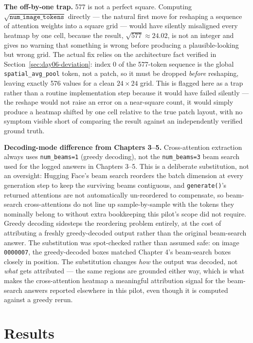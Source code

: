 \textbf{The off-by-one trap.} 577 is not a perfect square. Computing
$\sqrt{\texttt{num\_image\_tokens}}$ directly --- the natural first move for reshaping a sequence
of attention weights into a square grid --- would have silently misaligned every heatmap by one
cell, because the result, $\sqrt{577} \approx 24.02$, is not an integer and gives no warning that
something is wrong before producing a plausible-looking but wrong grid. The actual fix relies on
the architecture fact verified in Section~\ref{sec:day06-deviation}: index 0 of the 577-token
sequence is the global \texttt{spatial\_avg\_pool} token, not a patch, so it must be dropped
\emph{before} reshaping, leaving exactly 576 values for a clean $24 \times 24$ grid. This is
flagged here as a trap rather than a routine implementation step because it would have failed
silently --- the reshape would not raise an error on a near-square count, it would simply produce
a heatmap shifted by one cell relative to the true patch layout, with no symptom visible short of
comparing the result against an independently verified ground truth.

\textbf{Decoding-mode difference from Chapters 3--5.} Cross-attention extraction always uses
\texttt{num\_beams=1} (greedy decoding), not the \texttt{num\_beams=3} beam search used for the
logged answers in Chapters 3--5. This is a deliberate substitution, not an oversight: Hugging
Face's beam search reorders the batch dimension at every generation step to keep the surviving
beams contiguous, and \texttt{generate()}'s returned attentions are not automatically
un-reordered to compensate, so beam-search cross-attentions do not line up sample-by-sample with
the tokens they nominally belong to without extra bookkeeping this pilot's scope did not require.
Greedy decoding sidesteps the reordering problem entirely, at the cost of attributing a freshly
greedy-decoded output rather than the original beam-search answer. The substitution was
spot-checked rather than assumed safe: on image \texttt{0000007}, the greedy-decoded boxes
matched Chapter 4's beam-search boxes closely in position. The substitution changes \emph{how}
the output was decoded, not \emph{what} gets attributed --- the same regions are grounded either
way, which is what makes the cross-attention heatmap a meaningful attribution signal for the
beam-search answers reported elsewhere in this pilot, even though it is computed against a
greedy rerun.

\section{Results}

